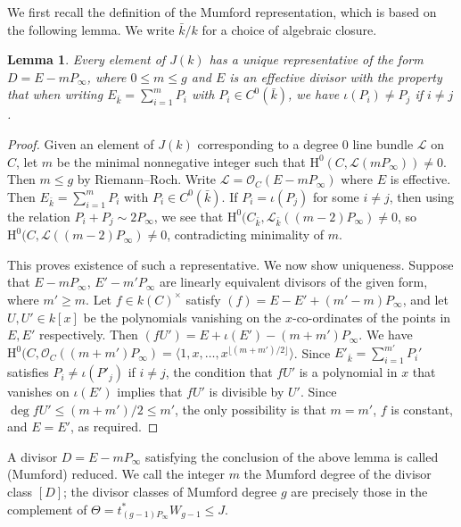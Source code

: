 \documentclass{article} %
\newtheorem{lemma}[proposition]{Lemma}
\numberwithin{equation}{section}
\newcommand{\sh}[1]{\mathscr{#1}}
\renewcommand{\O}{\mathcal{O}}
\newcommand{\HH}{\mathrm{H}}
\newcommand{\cO}{\mathcal{O}}
\begin{document}
We first recall the definition of the Mumford representation, which is based on the following lemma. We write $\bar{k} / k$ for a choice of algebraic closure. 
\begin{lemma}
    Every element of $J(k)$ has a unique representative of the form $D = E - m P_\infty$, where $0\leq m\leq g$ and $E$ is an effective divisor with the property that when writing $E_{\bar{k}} = \sum_{i=1}^m P_i$ with $P_i \in C^0(\bar{k})$, we have $\iota(P_i) \neq P_j$ if $i \neq j$.
\end{lemma}
\begin{proof}
    Given an element of $J(k)$ corresponding to a degree 0 line bundle $\sh{L}$ on $C$, let $m$ be the minimal nonnegative integer such that $\HH^0(C, \sh{L}(mP_{\infty}))\neq0$. 
    Then $m\leq g$ by Riemann--Roch.
    Write $\sh{L} = \O_C(E - mP_{\infty})$ where $E$ is effective.
    Then $E_{\bar{k}} = \sum_{i=1}^m P_i$ with $P_i \in C^0(\bar{k})$. 
    If $P_i = \iota(P_j)$ for some $i\neq j$, then using the relation $P_i + P_j \sim 2P_{\infty}$, we see that $\HH^0(C_{\bar{k}}, \sh{L}_{\bar{k}}((m-2)P_{\infty})\neq 0$, so $\HH^0(C, \sh{L}((m-2)P_{\infty})\neq 0$, contradicting minimality of $m$. 
    
    This proves existence of such a representative. We now show uniqueness. Suppose that $E - m P_\infty$, $E' - m' P_\infty$ are linearly equivalent divisors of the given form, where $m' \geq m$. Let $f \in k(C)^\times$ satisfy $(f) = E - E' + (m' - m) P_\infty$, and let $U, U' \in k[x]$ be the polynomials vanishing on the $x$-co-ordinates of the points in $E, E'$ respectively. Then $(f U') = E + \iota(E') - (m + m') P_\infty$. We have $\HH^0(C, \cO_C((m + m')P_\infty) = \langle 1, x, \dots, x^{\lfloor (m + m')/2 \rfloor} \rangle$. Since $E'_{\overline{k}} = \sum_{i=1}^{m'} P_i'$ satisfies $P_i \neq \iota(P'_j)$ if $i \neq j$, the condition that $f U'$ is a polynomial in $x$ that vanishes on $\iota(E')$ implies that $f U'$ is divisible by $U'$. Since $\deg f U' \leq (m + m')/ 2 \leq m'$, the only possibility is that $m = m'$, $f$ is constant, and $E = E'$, as required.
\end{proof}

A divisor $D=E- mP_{\infty}$ satisfying the conclusion of the above lemma is called (Mumford) reduced. 
We call the integer $m$ the Mumford degree of the divisor class $[D]$; the divisor classes of Mumford degree $g$ are precisely those in the complement of $\Theta = t_{(g-1)P_\infty}^\ast W_{g-1} \leq J$. 
\end{document}
